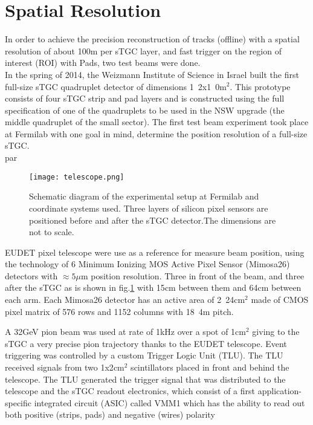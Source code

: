 	\section{Spatial Resolution}
	In order to achieve the precision reconstruction of tracks (offline) with a spatial resolution of about
	\unit{100}{\micro m} per sTGC layer, and fast trigger on the region of interest (ROI) with Pads, two test beams were done.\\
	In the spring of 2014, the Weizmann Institute of Science in Israel built the first full-size sTGC quadruplet detector of
	dimensions \unit{1.2x1.0}{m$^2$}. This prototype consists of four sTGC strip and pad layers and is constructed using the full
	specification of one of the quadruplets to be used in the NSW upgrade (the middle quadruplet of the small sector).
	The first test beam experiment took place at Fermilab with one goal in mind, determine the position resolution of a
	full-size sTGC.\\par
	\begin{figure}[!ht]
		\centering
		\texttt{[image: telescope.png]}
		\caption{\small Schematic diagram of the experimental setup at Fermilab and coordinate systems used. Three layers of silicon pixel sensors are positioned before and after the sTGC detector.The dimensions are not to scale.}\label{fig:telescope}
	\end{figure}
	EUDET pixel telescope were use as a reference for measure beam position, using the technology of 6 Minimum Ionizing MOS
	Active Pixel Sensor (Mimosa26) detectors with $\approx 5 \mu$m position resolution. Three in front of the beam, and three
	after the sTGC as is shown in fig.\ref{fig:telescope} with \unit{15}{cm} between them and \unit{64}{cm} between each arm.
	Each Mimosa26 detector has an active area of \unit{2.24}{cm$^2$} made of CMOS pixel
	matrix of 576 rows and 1152 columns with \unit{18.4}{\micro m} pitch.\par
	A \unit{32}{GeV} pion beam was used at rate of \unit{1}{kHz} over a spot of \unit{1}{cm$^2$} giving to the sTGC a very
	precise pion trajectory thanks to the EUDET telescope.
	Event triggering was controlled by a custom Trigger Logic Unit (TLU). The TLU received signals from two
	\unit{1x2}{cm$^2$}
	scintillators placed in front and behind the telescope. The TLU generated the trigger signal that was distributed to the
	telescope and the sTGC readout electronics, which consist of a first application-specific integrated circuit (ASIC)
	called VMM1 which has the ability to read out both positive (strips, pads) and negative (wires) polarity
